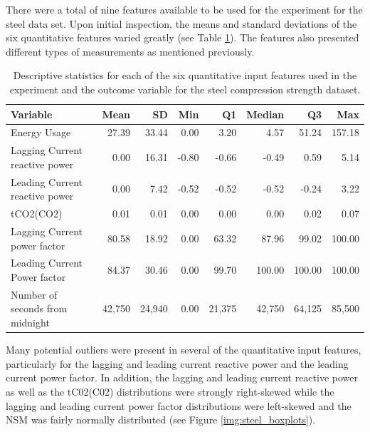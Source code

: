 \documentclass[10pt]{article}\usepackage[]{graphicx}\usepackage[]{xcolor}
\begin{document}
There were a total of nine features available to be used for the experiment for the steel data set. Upon initial inspection, the means and standard deviations of the six quantitative features varied greatly (see Table \ref{tab:steel_stats}). The features also presented different types of measurements as mentioned previously. \\

\begin{table}[h!]
  \begin{center}
    \begin{tabular}{l|r|r|r|r|r|r|r}
    \textbf{Variable} & \textbf{Mean} & \textbf{SD} & \textbf{Min} & \textbf{Q1} & \textbf{Median} & \textbf{Q3} & \textbf{Max} \\
      \hline
      Energy Usage & 27.39 & 33.44 & 0.00 & 3.20 & 4.57 & 51.24 & 157.18 \\
      Lagging Current reactive power & 0.00 & 16.31 & -0.80 & -0.66 & -0.49 & 0.59 & 5.14 \\
      Leading Current reactive power & 0.00 & 7.42 & -0.52 & -0.52 & -0.52 & -0.24 & 3.22\\
      tCO2(CO2) & 0.01 & 0.01 & 0.00 & 0.00 & 0.00 & 0.02 & 0.07 \\
      Lagging Current power factor & 80.58 & 18.92 & 0.00 & 63.32 & 87.96 & 99.02 & 100.00 \\
      Leading Current Power factor & 84.37 & 30.46 & 0.00 & 99.70 & 100.00 & 100.00 & 100.00  \\
      Number of seconds from midnight & 42,750 & 24,940 & 0.00 & 21,375 & 42,750 & 64,125 & 85,500  \\
    \end{tabular}
    \caption{Descriptive statistics for each of the six quantitative input features used in the experiment and the outcome variable for the steel compression strength dataset.}
    \label{tab:steel_stats}
  \end{center}
\end{table}

Many potential outliers were present in several of the quantitative input features, particularly for the lagging and leading current reactive power and the leading current power factor. In addition, the lagging and leading current reactive power as well as the tC02(C02) distributions were strongly right-skewed while the lagging and leading current power factor distributions were left-skewed and the NSM was fairly normally distributed (see Figure \ref{img:steel_boxplots}). \\
\end{document}
